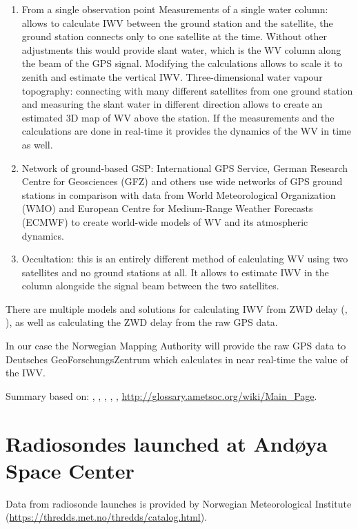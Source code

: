 \documentclass[]{book}
\begin{document}
	\begin{enumerate}
		\item From a single observation point
			\subitem Measurements of a single water column: allows to calculate IWV between the ground station and the satellite, the ground station connects only to one satellite at the time. Without other adjustments this would provide slant water, which is the WV column along the beam of the GPS signal. Modifying the calculations allows to scale it to zenith and estimate the vertical IWV.
			\subitem Three-dimensional water vapour topography: connecting with many different satellites from one ground station and measuring the slant water in different direction allows to create an estimated 3D map of WV above the station. If the measurements and the calculations are done in real-time it provides the dynamics of the WV in time as well.
		\item Network of ground-based GSP: International GPS Service, German Research Centre for Geosciences (GFZ) and others use wide networks of GPS ground stations in comparison with data from World Meteorological Organization (WMO) and European Centre for Medium-Range Weather Forecasts (ECMWF) to create world-wide models of WV and its atmospheric dynamics.
		\item Occultation: this is an entirely different method of calculating WV using two satellites and no ground stations at all. It allows to estimate IWV in the column alongside the signal beam between the two satellites.
	\end{enumerate}
	
	There are multiple models and solutions for calculating IWV from ZWD delay (\cite{On_the_determination}, \cite{Geospatial_algebraic_computations}), as well as calculating the ZWD delay from the raw GPS data.
	
	In our case the Norwegian Mapping Authority will provide the raw GPS data to Deutsches GeoForschungsZentrum which calculates in near real-time the value of the IWV.
	
	Summary based on: \cite{On_the_determination}, \cite{Geospatial_algebraic_computations}, \cite{BORBAS}, \cite{NASA}, \cite{amt-9-79-2016}, \url{http://glossary.ametsoc.org/wiki/Main\_Page}.
	
	\section{Radiosondes launched at And\o{}ya Space Center}
	
	Data from radiosonde launches is provided by Norwegian Meteorological Institute (\url{https://thredds.met.no/thredds/catalog.html}).
	
\end{document}
